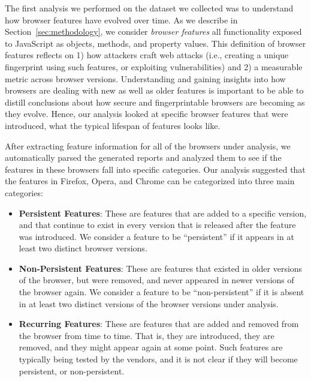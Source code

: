 The first analysis we performed on the dataset we collected was to
understand how browser features have evolved over time. As we describe
in Section~\ref{sec:methodology}, we consider \textit{browser features}
all functionality exposed to JavaScript as objects, methods, and property values.
This definition of browser features reflects on 1) how attackers craft web attacks
(i.e., creating a unique fingerprint using such features, or exploiting  vulnerabilities) and 2)
a measurable metric across browser versions. Understanding
and gaining insights into how browsers are dealing with new
as well as older features is important to be able to distill
conclusions about how secure and fingerprintable browsers are becoming
as they evolve. Hence, our analysis looked at specific browser
features that were introduced, what the typical lifespan of features
looks like.

After extracting feature information for all of the browsers under
analysis, we automatically parsed the generated reports and analyzed
them to see if the features in these browsers fall into specific
categories. Our analysis suggested that the features in Firefox, Opera, and
Chrome can be categorized into three main categories:

\begin{itemize}
  
\item \textbf{Persistent Features}: These are features that are added to a
  specific version, and that continue to exist in every version that
  is released after the feature was introduced. We consider a feature
  to be ``persistent'' if it appears in at least two distinct browser
  versions.
      
\item \textbf{Non-Persistent Features}: These are features that existed in
  older versions of the browser, but were removed, and never appeared
  in newer versions of the browser again. We consider a feature to be
  ``non-persistent'' if it is absent in at least two distinct versions
  of the browser versions under analysis.
      
\item \textbf{Recurring Features}: These are features that are added and
  removed from the browser from time to time. That is, they are
  introduced, they are removed, and they might appear again at some
  point. Such features are typically being tested by the vendors, and
  it is not clear if they will become persistent, or non-persistent.

\end{itemize}

